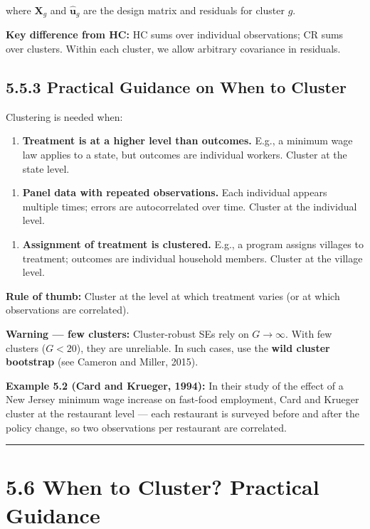 where $\mathbf{X}_g$ and $\hat{\mathbf{u}}_g$ are the design matrix and residuals for cluster $g$.

\textbf{Key difference from HC:} HC sums over individual observations; CR sums over clusters. Within each cluster, we allow arbitrary covariance in residuals.

\subsection{5.5.3 Practical Guidance on When to Cluster}

Clustering is needed when:

\begin{enumerate}
\item \textbf{Treatment is at a higher level than outcomes.} E.g., a minimum wage law applies to a state, but outcomes are individual workers. Cluster at the state level.
\end{enumerate}

\begin{enumerate}
\item \textbf{Panel data with repeated observations.} Each individual appears multiple times; errors are autocorrelated over time. Cluster at the individual level.
\end{enumerate}

\begin{enumerate}
\item \textbf{Assignment of treatment is clustered.} E.g., a program assigns villages to treatment; outcomes are individual household members. Cluster at the village level.
\end{enumerate}

\textbf{Rule of thumb:} Cluster at the level at which treatment varies (or at which observations are correlated).

\textbf{Warning --- few clusters:} Cluster-robust SEs rely on $G \to \infty$. With few clusters ($G < 20$), they are unreliable. In such cases, use the \textbf{wild cluster bootstrap} (see Cameron and Miller, 2015).

\textbf{Example 5.2 (Card and Krueger, 1994):} In their study of the effect of a New Jersey minimum wage increase on fast-food employment, Card and Krueger cluster at the restaurant level --- each restaurant is surveyed before and after the policy change, so two observations per restaurant are correlated.

\medskip\hrule\medskip

\section{5.6 When to Cluster? Practical Guidance}

